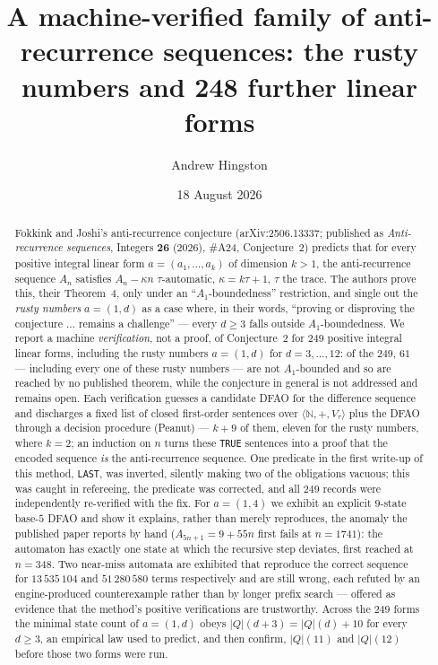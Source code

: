 \documentclass[10pt,reqno]{amsart}
\theoremstyle{plain}
\theoremstyle{definition}
\theoremstyle{remark}
\numberwithin{theorem}{section}
\newcommand{\N}{\mathbb{N}}
\begin{document}
\title[Machine verification for the rusty numbers]{A machine-verified family of anti-recurrence
sequences: the rusty numbers and 248 further linear forms}

\author{Andrew Hingston}

\date{18 August 2026}


\begin{abstract}
Fokkink and Joshi's anti-recurrence conjecture (arXiv:2506.13337; published as
\emph{Anti-recurrence sequences}, Integers \textbf{26} (2026), \#A24, Conjecture~2) predicts
that for every positive integral linear form $a=(a_1,\dots,a_k)$ of dimension $k>1$, the
anti-recurrence sequence $A_n$ satisfies $A_n-\kappa n$ $\tau$-automatic, $\kappa=k\tau+1$,
$\tau$ the trace. The authors prove this, their Theorem~4, only under an
``$A_1$-boundedness'' restriction, and single out the \emph{rusty numbers} $a=(1,d)$ as a case
where, in their words, ``proving or disproving the conjecture $\dots$ remains a challenge'' ---
every $d\ge3$ falls outside $A_1$-boundedness. We report a machine \emph{verification}, not a
proof, of Conjecture~2 for $249$ positive integral linear forms, including the rusty numbers
$a=(1,d)$ for $d=3,\dots,12$: of the $249$, $61$ --- including every one of these rusty numbers
--- are not $A_1$-bounded and so are reached by no published theorem, while the conjecture in
general is not addressed and remains open. Each
verification guesses a candidate DFAO for the difference sequence and discharges a fixed list
of closed first-order sentences over $\langle\N,+,V_\tau\rangle$ plus the DFAO through a
decision procedure (Peanut) --- $k+9$ of them, eleven for the rusty numbers, where $k=2$; an
induction on $n$ turns these \texttt{TRUE} sentences into a proof that the encoded sequence
\emph{is} the anti-recurrence sequence. One predicate in the first write-up of this method,
\texttt{LAST}, was inverted, silently making two of the obligations vacuous; this was caught in refereeing, the predicate was corrected, and all $249$
records were independently re-verified with the fix. For $a=(1,4)$ we exhibit an explicit
$9$-state base-$5$ DFAO and show it explains, rather than merely reproduces, the anomaly the
published paper reports by hand ($A_{5n+1}=9+55n$ first fails at $n=1741$): the automaton has
exactly one state at which the recursive step deviates, first reached at $n=348$. Two near-miss
automata are exhibited that reproduce the correct sequence for $13\,535\,104$ and $51\,280\,580$
terms respectively and are still wrong, each refuted by an engine-produced counterexample rather
than by longer prefix search --- offered as evidence that the method's positive verifications are
trustworthy. Across the $249$ forms the minimal state count of $a=(1,d)$ obeys
$|Q|(d+3)=|Q|(d)+10$ for every $d\ge3$, an empirical law used to predict, and then confirm,
$|Q|(11)$ and $|Q|(12)$ before those two forms were run.
\end{abstract}
\end{document}
